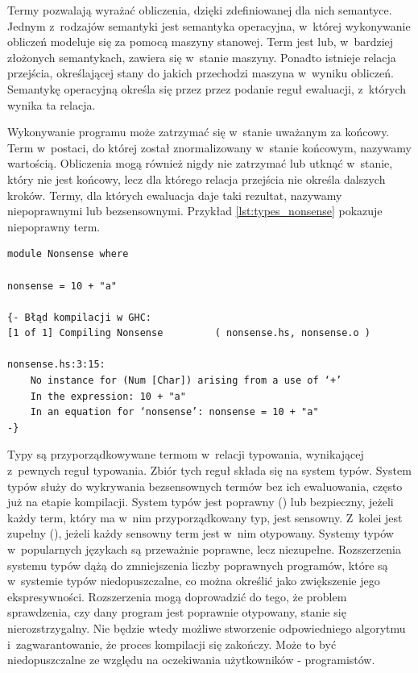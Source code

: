 Termy pozwalają wyrażać obliczenia, dzięki zdefiniowanej dla nich semantyce.
Jednym z~rodzajów semantyki jest semantyka operacyjna, w~której wykonywanie
obliczeń modeluje się za pomocą maszyny stanowej. Term jest lub, w~bardziej
złożonych semantykach, zawiera się w~stanie maszyny. Ponadto istnieje relacja
przejścia, określającej stany do jakich przechodzi maszyna w~wyniku obliczeń.
Semantykę operacyjną określa się przez przez podanie reguł ewaluacji, z~których
wynika ta relacja.

Wykonywanie programu może zatrzymać się w~stanie uważanym za końcowy. Term
w~postaci, do której został znormalizowany w~stanie końcowym, nazywamy wartością.
Obliczenia mogą również nigdy nie zatrzymać lub utknąć w~stanie, który nie jest
końcowy, lecz dla którego relacja przejścia nie określa dalszych kroków.
Termy, dla których ewaluacja daje taki rezultat, nazywamy niepoprawnymi lub
bezsensownymi\cite{TAPL}. Przykład \ref{lst:types_nonsense} pokazuje niepoprawny term.

\begin{lstlisting}[float,label={lst:types_nonsense},
                   caption={Przykład bezsensownego wyrażenia w programie, z błędem GHC, który wywołuje.}]
module Nonsense where

nonsense = 10 + "a"

{- Błąd kompilacji w GHC:
[1 of 1] Compiling Nonsense         ( nonsense.hs, nonsense.o )

nonsense.hs:3:15:
    No instance for (Num [Char]) arising from a use of ‘+’
    In the expression: 10 + "a"
    In an equation for ‘nonsense’: nonsense = 10 + "a"
-}
\end{lstlisting}

Typy są przyporządkowywane termom w~relacji typowania, wynikającej z~pewnych
reguł typowania. Zbiór tych reguł składa się na system typów. System typów służy do
wykrywania bezsensownych termów bez ich ewaluowania, często już na etapie kompilacji.
System typów jest poprawny () lub bezpieczny,
jeżeli każdy term, który ma w~nim przyporządkowany typ, jest sensowny. Z~kolei
jest zupełny (), jeżeli każdy sensowny term jest w~nim otypowany.
Systemy typów w~popularnych językach są przeważnie poprawne, lecz niezupełne. Rozszerzenia
systemu typów dążą do zmniejszenia liczby poprawnych programów, które są
w~systemie typów niedopuszczalne, co można określić jako zwiększenie jego
ekspresywności. Rozszerzenia mogą doprowadzić do tego, że problem sprawdzenia,
czy dany program jest poprawnie otypowany, stanie się nierozstrzygalny. Nie
będzie wtedy możliwe stworzenie odpowiedniego algorytmu i~zagwarantowanie, że
proces kompilacji się zakończy. Może to być niedopuszczalne ze względu na
oczekiwania użytkowników - programistów\cite{TAPL}.

